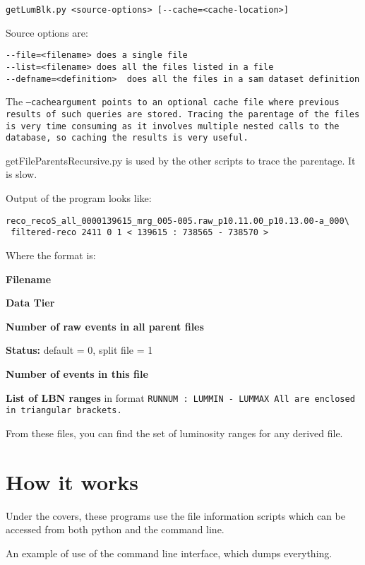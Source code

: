 \documentclass[12pt]{article}
\begin{document}
\begin{verbatim}
getLumBlk.py <source-options> [--cache=<cache-location>]
\end{verbatim}

Source options are:

\begin{verbatim}
--file=<filename> does a single file
--list=<filename> does all the files listed in a file
--defname=<definition>  does all the files in a sam dataset definition
\end{verbatim}

The \tt--cache\rm argument points to an optional cache file where
previous results of such queries are stored. Tracing the parentage of
the files is very time consuming as it involves multiple nested calls
to the database, so caching the results is very useful.

getFileParentsRecursive.py is used by the other scripts to trace the
parentage.  It is slow.


Output of the program looks like:

\begin{verbatim}
reco_recoS_all_0000139615_mrg_005-005.raw_p10.11.00_p10.13.00-a_000\
 filtered-reco 2411 0 1 < 139615 : 738565 - 738570 >
\end{verbatim}

Where the format is:
\begin{description}
\item{\bf Filename}
\item{\bf Data Tier}
\item{\bf Number of raw events in all parent files}
\item{\bf Status:} default = 0, split file = 1
\item{\bf Number of events in this file}
\item{\bf List of LBN ranges} in format \tt RUNNUM : LUMMIN - LUMMAX \rm\break
All are enclosed in triangular brackets.
\end{description}

From these files, you can find the set of luminosity ranges for any
derived file.

\section{How it works}
Under the covers, these programs use the file information scripts
which can be accessed from both python and the command line.

An example of use of the command line interface, which dumps
everything.
\end{document}
